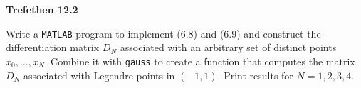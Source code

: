 \textbf{Trefethen 12.2}

Write a \texttt{MATLAB} program to implement (6.8) and (6.9) and construct the differentiation matrix $D_N$ associated
with an arbitrary set of distinct points $x_0, \ldots, x_N$. Combine it with \texttt{gauss} to create a function that
computes the matrix $D_N$ associated with Legendre points in $(-1, 1)$. Print results for $N = 1, 2, 3, 4$.

\begin{solution}
\end{solution}